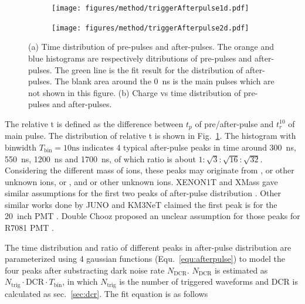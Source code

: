 \begin{figure}[!htbp]
    \centering
    \begin{subfigure}[t]{\LF\textwidth}
        \texttt{[image: figures/method/triggerAfterpulse1d.pdf]}
        \caption{}%
        \label{fig:afterpulse1d}
    \end{subfigure}
    \begin{subfigure}[t]{\LF\textwidth}
        \texttt{[image: figures/method/triggerAfterpulse2d.pdf]}
        \caption{}
        \label{fig:afterpulse2d}
    \end{subfigure}
    \caption{(a) Time distribution of pre-pulses and after-pulses. The orange and blue histograms are respectively ditributions of pre-pulses and after-pulses. The green line is the fit result for the distribution of after-pulses. The blank area around the \SI{0}{ns} is the main pulses which are not shown in this figure. (b) Charge vs time distribution of pre-pulses and after-pulses.}
\end{figure}

The relative t is defined as the difference between $t_p$ of pre/after-pulse and $t_r^{10}$ of main pulse. The distribution of relative t is shown in Fig.~\ref{fig:afterpulse1d}. The histogram with binwidth $T_{\mathrm{bin}}=10\mathrm{ns}$ indicates 4 typical after-pulse peaks in time around \SI{300}{ns}, \SI{550}{ns}, \SI{1200}{ns} and \SI{1700}{ns}, of which ratio is about $1:\sqrt{3}:\sqrt{16}:\sqrt{32}$. Considering the different mass of ions, these peaks may originate from ,  or other unknown ions,  or , and  or other unknown ions. XENON1T and XMass gave similar assumptions for the first two peaks of after-pulse distribution \cite{XENON1TTesting, Abe_2020}. Other similar works done by JUNO and KM3NeT claimed the first peak is  for the \SI{20}{inch} PMT \cite{Zhao:2022gks,KM3NetTesting}. Double Chooz proposed an unclear assumption for those peaks for R7081 PMT \cite{Haser_2013}.

The time distribution and ratio of different peaks in after-pulse distribution are parameterized using 4 gaussian functions (Equ.~\eqref{equ:afterpulse}) to model the four peaks after substracting dark noise rate $N_{\mathrm{DCR}}$. $N_{\mathrm{DCR}}$ is estimated as $N_{\mathrm{trig}}\cdot \mathrm{DCR}\cdot T_{\mathrm{bin}}$, in which $N_{\mathrm{trig}}$ is the number of triggered waveforms and DCR is calculated as sec.~\ref{sec:dcr}. The fit equation is as follows

